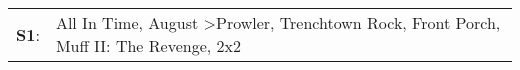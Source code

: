 \begin{supertabular}{p{0.03\textwidth}p{0.92\textwidth}}
 \textbf{S1}:  &  All In Time\textsuperscript{}, \enspace August\textsuperscript{} \textgreater \enspace Prowler\textsuperscript{}, \enspace Trenchtown Rock\textsuperscript{}, \enspace Front Porch\textsuperscript{}, \enspace Muff II: The Revenge\textsuperscript{}, \enspace 2x2\textsuperscript{}  \enspace  \\
\end{supertabular}
